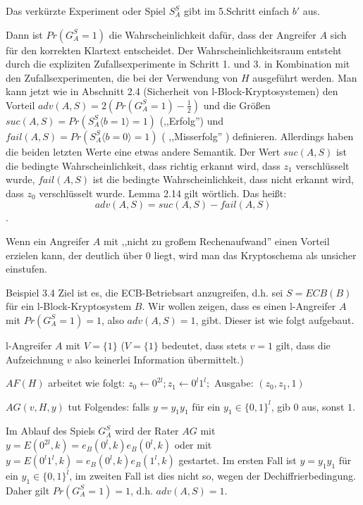\documentclass[a4paper]{article}
\begin{document}
\begin{multicols}{3}
    Das verkürzte Experiment oder Spiel $S^S_A$ gibt im 5.Schritt einfach $b'$ aus.

    Dann ist $Pr(G^S_A = 1)$ die Wahrscheinlichkeit dafür, dass der Angreifer $A$ sich für den korrekten Klartext entscheidet. Der Wahrscheinlichkeitsraum entsteht durch die expliziten Zufallsexperimente in Schritt 1. und 3. in Kombination mit den Zufallsexperimenten, die bei der Verwendung von $H$ ausgeführt werden. Man kann jetzt wie in Abschnitt 2.4 (Sicherheit von l-Block-Kryptosystemen) den Vorteil $adv(A,S) = 2(Pr(G^S_A= 1)-\frac{1}{2})$ und die Größen $suc(A,S) = Pr(S^S_A\langle b= 1\rangle = 1)$ (,,Erfolg'') und $fail(A,S) = Pr(S_A^S\langle b= 0\rangle = 1)$ ( ,,Misserfolg'' ) definieren. Allerdings haben die beiden letzten Werte eine etwas andere Semantik. Der Wert $suc(A,S)$ ist die bedingte Wahrscheinlichkeit, dass richtig erkannt wird, dass $z_1$ verschlüsselt wurde, $fail(A,S)$ ist die bedingte Wahrscheinlichkeit, dass nicht erkannt wird, dass $z_0$ verschlüsselt wurde. Lemma 2.14 gilt wörtlich. Das heißt: $$adv(A,S) = suc(A,S)-fail(A,S)$$.

    Wenn ein Angreifer $A$ mit ,,nicht zu großem Rechenaufwand'' einen Vorteil erzielen kann, der deutlich über $0$ liegt, wird man das Kryptoschema als unsicher einstufen.

    Beispiel 3.4 Ziel ist es, die ECB-Betriebsart anzugreifen, d.h. sei $S=ECB(B)$ für ein l-Block-Kryptosystem $B$. Wir wollen zeigen, dass es einen l-Angreifer $A$ mit $Pr(G^S_A= 1) = 1$, also $adv(A,S) = 1$, gibt. Dieser ist wie folgt aufgebaut.
    \begin{itemize*}
        \item l-Angreifer $A$ mit $V=\{1\}$ ($V=\{1\}$ bedeutet, dass stets $v=1$ gilt, dass die Aufzeichnung $v$ also keinerlei Information übermittelt.)
        \item $AF(H)$ arbeitet wie folgt: $z_0\leftarrow 0^{2l}; z_1\leftarrow 0^l 1^l;$ Ausgabe: $(z_0,z_1 ,1)$
        \item $AG(v,H,y)$ tut Folgendes: falls $y=y_1y_1$ für ein $y_1\in\{0,1\}^l$, gib $0$ aus, sonst $1$.
    \end{itemize*}

    Im Ablauf des Spiels $G^S_A$ wird der Rater $AG$ mit $y=E(0^{2l},k)=e_B(0^l,k)e_B(0^l,k)$ oder mit $y=E(0^l 1^l,k)=e_B(0^l,k)e_B(1^l,k)$ gestartet. Im ersten Fall ist $y=y_1y_1$ für ein $y_1\in\{0,1\}^l$, im zweiten Fall ist dies nicht so, wegen der Dechiffrierbedingung. Daher gilt $Pr(G^S_A= 1) = 1$, d.h. $adv(A,S) = 1$.


\end{multicols}
\end{document}
